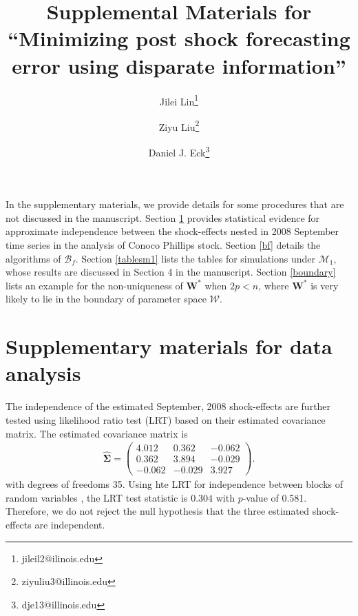 \documentclass[11pt]{article}
\title{Supplemental Materials for ``Minimizing post shock forecasting error using disparate information''}
\author{Jilei Lin\thanks{jileil2@ilinois.edu}}
\author{Ziyu Liu\thanks{ziyuliu3@illinois.edu}}
\author{Daniel J. Eck\thanks{dje13@illinois.edu}}
\affil{Department of Statistics, University of Illinois at Urbana-Champaign}
\def\mbf#1{\mathbf{#1}} %
\def\mc#1{\mathcal{#1}} %
\theoremstyle{definition}
\begin{document}
\maketitle

In the supplementary materials, we provide details for some procedures that are not discussed in the manuscript. Section \ref{smfda} provides statistical evidence for approximate independence between  the shock-effects nested in 2008 September time series in the analysis of Conoco Phillips stock. Section \ref{bf} details the algorithms of $\mc{B}_f$. Section  \ref{tablesm1} lists the tables for simulations under $\mc{M}_1$, whose results are discussed in Section 4 in the manuscript. Section \ref{boundary} lists an example for the non-uniqueness of $\mbf{W}^*$ when $2p < n$, where $\mbf{W}^*$ is very likely to lie in the boundary of parameter space $\mc{W}$.


\section{Supplementary materials for data analysis}
\label{smfda}
The independence of the estimated September, 2008 shock-effects are further tested using likelihood ratio test (LRT) based on their estimated covariance matrix. The estimated covariance matrix is
\begin{align*}
  \hat{\mathbf{\Sigma}}=\left(\begin{array}{rrr}
    4.012 & 0.362 & -0.062 \\
    0.362 & 3.894 & -0.029 \\
    -0.062 & -0.029 & 3.927
  \end{array}\right).
\end{align*}
with degrees of freedoms 35. Using hte LRT for independence between blocks of random variables \citep[Section 10.2]{msos}, the LRT test statistic is $0.304$ with $p$-value of 0.581. Therefore, we do not reject  the null hypothesis that the three estimated shock-effects are independent.
\end{document}
